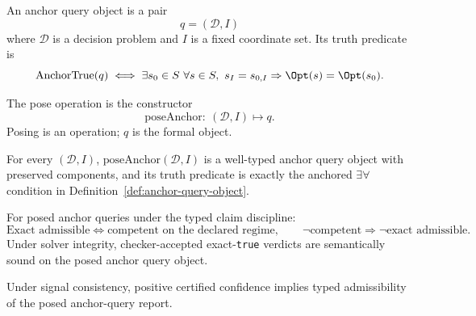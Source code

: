 \begin{definition}\label{def:anchor-query-object}
An anchor query object is a pair
\[
q=(\mathcal{D},I)
\]
where $\mathcal{D}$ is a decision problem and $I$ is a fixed coordinate set. Its truth predicate is
\[
\mathrm{AnchorTrue}(q)\iff
\exists s_0\in S\ \forall s\in S,\ s_I=s_{0,I}\Rightarrow \Opt(s)=\Opt(s_0).
\]
\end{definition}

\begin{definition}\label{def:pose-anchor-query}
The pose operation is the constructor
\[
\mathrm{poseAnchor}:\ (\mathcal{D},I)\mapsto q.
\]
Posing is an operation; $q$ is the formal object.
\end{definition}

\begin{proposition}\label{prop:pose-anchor-object}
For every $(\mathcal{D},I)$, $\mathrm{poseAnchor}(\mathcal{D},I)$ is a well-typed anchor query object with preserved components, and its truth predicate is exactly the anchored $\exists\forall$ condition in Definition~\ref{def:anchor-query-object}.
\end{proposition}

\begin{proposition}\label{prop:posed-anchor-typed-exact}
For posed anchor queries under the typed claim discipline:
\[
\text{Exact admissible}\iff\text{competent on the declared regime},\qquad
\neg\text{competent}\Rightarrow\neg\text{exact admissible}.
\]
Under solver integrity, checker-accepted exact-\texttt{true} verdicts are semantically sound on the posed anchor query object.
\end{proposition}

\begin{corollary}\label{cor:posed-anchor-certified-gate}
Under signal consistency, positive certified confidence implies typed admissibility of the posed anchor-query report.
\end{corollary}

